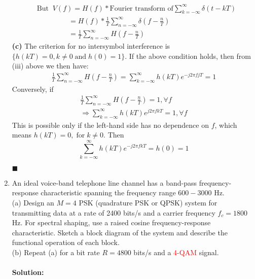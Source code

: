 \documentclass[a4paper,12pt]{article}
\begin{document}
\begin{enumerate}
\begin{align*}
                & \text{But} \;\; V(f) = H(f) * \text{Fourier transform of} \sum_{k = -\infty}^{\infty} \delta(t - kT) \\
                &   \;\;\;\;\;\;\;\;\;\;\;\;\;\;\;\; = H(f) * \frac{1}{T} \sum_{n = -\infty}^{\infty} \delta(f - \frac{n}{T}) \\
                &   \;\;\;\;\;\;\;\;\;\;\;\;\;\;\;\; = \frac{1}{T} \sum_{n = -\infty}^{\infty} H(f - \frac{n}{T})
            \end{align*}
            \textbf{(c)} 
            The criterion for no intersymbol interference is $\{ h(kT) = 0, k \neq 0 \; \text{and} \; h(0) = 1 \}$. If the above condition holds, then from (iii) above we then have:
            \begin{align*}
                \frac{1}{T} \sum_{n = -\infty}^{\infty} H(f - \frac{n}{T}) = \sum_{k = -\infty}^{\infty} h(kT)e^{-j2\pi fjT} = 1
            \end{align*}
            Conversely, if
            \begin{align*}
                \frac{1}{T} \sum_{n = -\infty}^{\infty} H(f - \frac{n}{T}) = 1, \forall f \\
                \Rightarrow \sum_{k = -\infty}^{\infty} h(kT) e^{j2\pi fkT} = 1, \forall f
            \end{align*}
            This is possible only if the left-hand side has no dependence on $f$, which means $h(kT) = 0, \; \text{for} \; k \neq 0$. Then $$\sum_{k = -\infty}^{\infty} h(kT) e^{-j2\pi fkT} = h(0) = 1$$
            \begin{flushright}
                $\blacksquare$
            \end{flushright}
        \item 
            An ideal voice-band telephone line channel has a band-pass frequency-response characteristic spanning the frequency range $600-3000$ Hz. \\ 
            (a) Design an $M = 4$ PSK (quadrature PSK or QPSK) system for transmitting data at a rate of 2400 bits/s and a carrier frequency $f_c = 1800$ Hz. For spectral shaping, use a raised cosine frequency-response characteristic. Sketch a block diagram of the system and describe the functional operation of each block. \\
            (b) Repeat (a) for a bit rate $R = 4800$ bits/s and a \textcolor{red}{4-QAM }signal. \\ \\ 
            \textbf{Solution:} \\

\end{enumerate}
\end{document}
